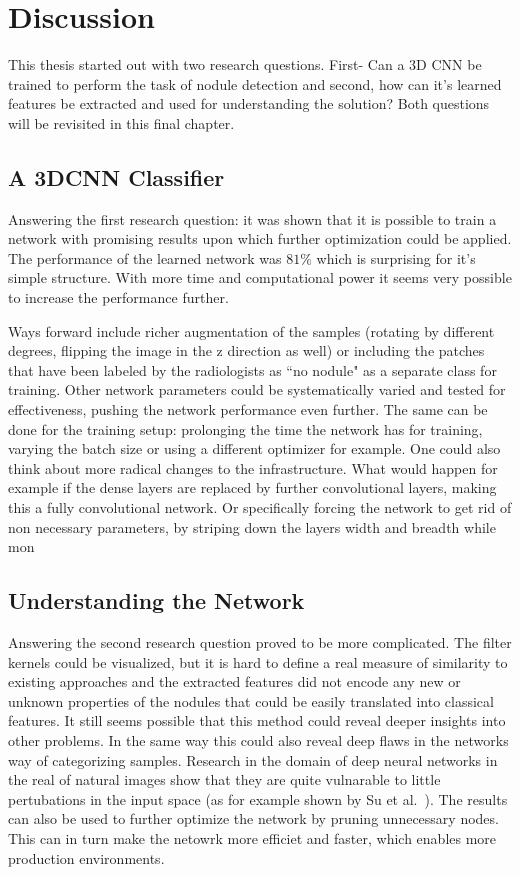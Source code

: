 \documentclass[main.tex]{subfiles}
\begin{document}
\chapter{Discussion}\label{chap:discussion}
This thesis started out with two research questions. First- Can a 3D CNN be trained to perform the task of nodule detection and second, how can it's learned features be extracted and used for understanding the solution? Both questions will be revisited in this final chapter.

\section{A 3DCNN Classifier}
Answering the first research question: it was shown that it is possible to train a network with promising results upon which further optimization could be applied. The performance of the learned network was $81\%$ which is surprising for it's simple structure. With more time and computational power it seems very possible to increase the performance further. 

Ways forward include richer augmentation of the samples (rotating by different degrees, flipping the image in the z direction as well) or including the patches that have been labeled by the radiologists as ``no nodule" as a separate class for training. Other network parameters could be systematically varied and tested for effectiveness, pushing the network performance even further. The same can be done for the training setup: prolonging the time the network has for training, varying the batch size or using a different optimizer for example. One could also think about more radical changes to the infrastructure. What would happen for example if the dense layers are replaced by further convolutional layers, making this a fully convolutional network. Or specifically forcing the network to get rid of non necessary parameters, by striping down the layers width and breadth while mon

\section{Understanding the Network}
Answering the second research question proved to be more complicated. The filter kernels could be visualized, but it is hard to define a real measure of similarity to existing approaches and the extracted features did not encode any new or unknown properties of the nodules that could be easily translated into classical features. It still seems possible that this method could reveal deeper insights into other problems. In the same way this could also reveal deep flaws in the networks way of categorizing samples. Research in the domain of deep neural networks in the real of natural images show that they are quite vulnarable to little pertubations in the input space (as for example shown by Su et al.~\cite{su2017one}). The results can also be used to further optimize the network by pruning unnecessary nodes. This can in turn make the netowrk more efficiet and faster, which enables more production environments.
\end{document}

